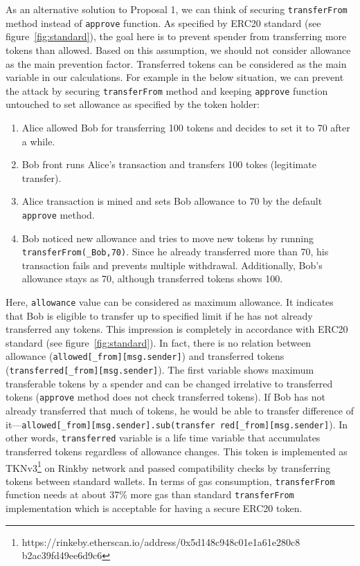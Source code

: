 As an alternative solution to Proposal 1, we can think of securing \texttt{transferFrom} method instead of \texttt{approve} function. As specified by ERC20 standard (see figure~\ref{fig:standard}), the goal here is to prevent spender from transferring more tokens than allowed. Based on this assumption, we should not consider allowance as the main prevention factor. Transferred tokens can be considered as the main variable in our calculations. For example in the below situation, we can prevent the attack by securing \texttt{transferFrom} method and keeping \texttt{approve} function untouched to set allowance as specified by the token holder:
\begin{enumerate}
	\item Alice allowed Bob for transferring 100 tokens and decides to set it to 70 after a while.
	\item Bob front runs Alice’s transaction and transfers 100 tokes (legitimate transfer).
	\item Alice transaction is mined and sets Bob allowance to 70 by the default \texttt{approve} method.
	\item Bob noticed new allowance and tries to move new tokens by running \texttt{transferFrom(\_Bob,70)}. Since he already transferred more than 70, his transaction fails and prevents multiple withdrawal. Additionally, Bob’s allowance stays as 70, although transferred tokens shows 100.
\end{enumerate}
Here, \texttt{allowance} value can be considered as maximum allowance. It indicates that Bob is eligible to transfer up to specified limit if he has not already transferred any tokens. This impression is completely in accordance with ERC20 standard (see figure~\ref{fig:standard}). In fact, there is no relation between allowance (\texttt{allowed[\_from][msg.sender]}) and transferred tokens (\texttt{transferred[\_from][msg.sender]}). The first variable shows maximum transferable tokens by a spender and can be changed irrelative to transferred tokens (\ie \texttt{approve} method does not check transferred tokens). If Bob has not already transferred that much of tokens, he would be able to transfer difference of it---\texttt{allowed[\_from][msg.sender].sub(transfer red[\_from][msg.sender]}). In other words, \texttt{transferred} variable is a life time variable that accumulates transferred tokens regardless of allowance changes. This token is implemented as TKNv3\footnote{https://rinkeby.etherscan.io/address/0x5d148c948c01e1a61e280c8 b2ac39fd49ee6d9c6} on Rinkby network and passed compatibility checks by transferring tokens between standard wallets. In terms of gas consumption, \texttt{transferFrom} function needs at about 37\% more gas than standard \texttt{transferFrom} implementation which is acceptable for having a secure ERC20 token.

